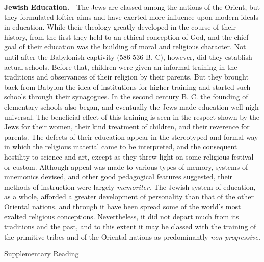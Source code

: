 \documentclass[
]{book}
\begin{document}
\textbf{Jewish Education.} - The Jews are classed among the nations of the Orient, but they formulated loftier aims and have exerted more influence upon modern ideals in education. While their theology greatly developed in the course of their history, from the first they held to an ethical conception of God, and the chief goal of their education was the building of moral and religious character. Not until after the Babylonish captivity (586-536 B. C), however, did they establish actual schools. Before that, children were given an informal training in the traditions and observances of their religion by their parents. But they brought back from Babylon the idea of institutions for higher training and started such schools through their synagogues. In the second century B. C. the founding of elementary schools also began, and eventually the Jews made education well-nigh universal. The beneficial effect of this training is seen in the respect shown by the Jews for their women, their kind treatment of children, and their reverence for parents. The defects of their education appear in the stereotyped and formal way in which the religious material came to be interpreted, and the consequent hostility to science and art, except as they threw light on some religious festival or custom. Although appeal was made to various types of memory, systems of mnemonics devised, and other good pedagogical features suggested, their methods of instruction were largely \emph{memoriter.} The Jewish system of education, as a whole, afforded a greater development of personality than that of the other Oriental nations, and through it have been spread some of the world's most exalted religious conceptions. Nevertheless, it did not depart much from its traditions and the past, and to this extent it may be classed with the training of the primitive tribes and of the Oriental nations as predominantly \emph{non-progressive.}

Supplementary Reading
\end{document}
